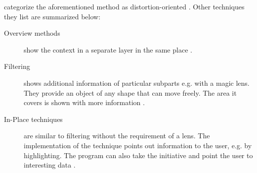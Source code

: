 \citeauthor{Kosara2003} categorize the aforementioned method as distortion-oriented . Other techniques they list are summarized below:
\begin{description}
\item[Overview methods] show the context in a separate layer in the same place .
\item[Filtering] shows additional information of particular subparts e.g. with a magic lens. They provide an object of any shape that can move freely. The area it covers is shown with more information .
\item[In-Place techniques] are similar to filtering without the requirement of a lens. The implementation of the technique points out information to the user, e.g. by highlighting. The program can also take the initiative and point the user to interesting data .
\end{description}
